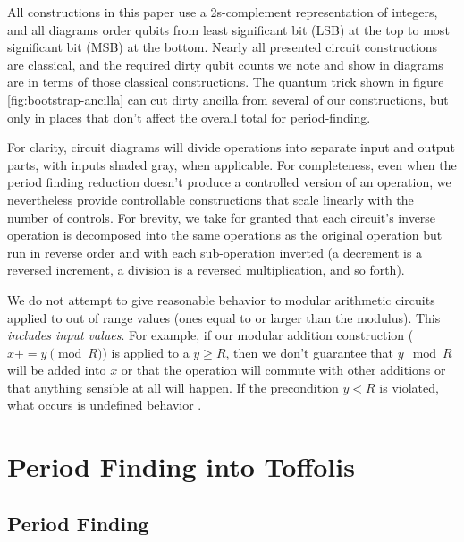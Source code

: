 \documentclass[twocolumn]{article}
\begin{document}
All constructions in this paper use a 2s-complement representation of integers, and all diagrams order qubits from least significant bit (LSB) at the top to most significant bit (MSB) at the bottom.
Nearly all presented circuit constructions are classical, and the required dirty qubit counts we note and show in diagrams are in terms of those classical constructions.
The quantum trick shown in figure \ref{fig:bootstrap-ancilla} can cut dirty ancilla from several of our constructions, but only in places that don't affect the overall total for period-finding.

For clarity, circuit diagrams will divide operations into separate input and output parts, with inputs shaded gray, when applicable.
For completeness, even when the period finding reduction doesn't produce a controlled version of an operation, we nevertheless provide controllable constructions that scale linearly with the number of controls.
For brevity, we take for granted that each circuit's inverse operation is decomposed into the same operations as the original operation but run in reverse order and with each sub-operation inverted (a decrement is a reversed increment, a division is a reversed multiplication, and so forth).

We do not attempt to give reasonable behavior to modular arithmetic circuits applied to out of range values (ones equal to or larger than the modulus).
This {\em includes input values}.
For example, if our modular addition construction ($x \mathrel{{+}{=}} y \pmod{R}$) is applied to a $y \geq R$, then we don't guarantee that $y \mod R$ will be added into $x$ or that the operation will commute with other additions or that anything sensible at all will happen.
If the precondition $y < R$ is violated, what occurs is undefined behavior \cite{c11}.


\section{Period Finding into Toffolis} \label{sec:construct}

\subsection{Period Finding}
\end{document}

